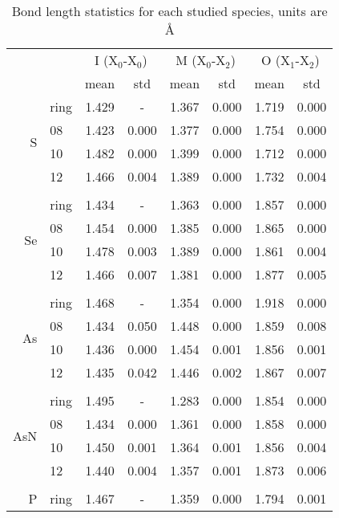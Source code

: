 \begin{table}
    \centering
    \caption[Bond length study]{Bond length statistics for each studied species, units are \si{\angstrom}}
    \begin{tabular}{@{}rlcccccc@{}}
        \toprule
        && \multicolumn{2}{c}{I (X$_0$-X$_0$)} & \multicolumn{2}{c}{M (X$_0$-X$_2$)} & \multicolumn{2}{c}{O (X$_1$-X$_2$)} \\
        && mean & std & mean & std & mean & std \\
        \midrule
        \multirow{4}{*}{S} & ring & 1.429 & - & 1.367 & 0.000 & 1.719 & 0.000 \\
        & 08 & 1.423 & 0.000 & 1.377 & 0.000 & 1.754 & 0.000 \\
        & 10 & 1.482 & 0.000 & 1.399 & 0.000 & 1.712 & 0.000 \\
        & 12 & 1.466 & 0.004 & 1.389 & 0.000 & 1.732 & 0.004 \\
        \\
        \multirow{4}{*}{Se} & ring & 1.434 & - & 1.363 & 0.000 & 1.857 & 0.000 \\
        & 08 & 1.454 & 0.000 & 1.385 & 0.000 & 1.865 & 0.000 \\
        & 10 & 1.478 & 0.003 & 1.389 & 0.000 & 1.861 & 0.004 \\
        & 12 & 1.466 & 0.007 & 1.381 & 0.000 & 1.877 & 0.005 \\
        \\
        \multirow{4}{*}{As} & ring & 1.468 & - & 1.354 & 0.000 & 1.918 & 0.000 \\
        & 08 & 1.434 & 0.050 & 1.448 & 0.000 & 1.859 & 0.008 \\
        & 10 & 1.436 & 0.000 & 1.454 & 0.001 & 1.856 & 0.001 \\
        & 12 & 1.435 & 0.042 & 1.446 & 0.002 & 1.867 & 0.007 \\
        \\
        \multirow{4}{*}{AsN} & ring & 1.495 & - & 1.283 & 0.000 & 1.854 & 0.000 \\
        & 08 & 1.434 & 0.000 & 1.361 & 0.000 & 1.858 & 0.000 \\
        & 10 & 1.450 & 0.001 & 1.364 & 0.001 & 1.856 & 0.004 \\
        & 12 & 1.440 & 0.004 & 1.357 & 0.001 & 1.873 & 0.006 \\
        \\
        \multirow{4}{*}{P} & ring & 1.467 & - & 1.359 & 0.000 & 1.794 & 0.001 \\

\end{tabular}
\end{table}
